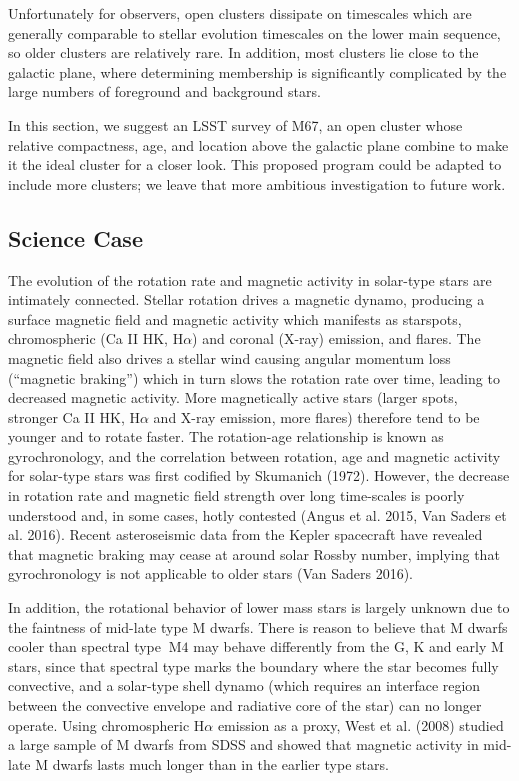 Unfortunately for observers, open clusters dissipate on timescales which are
generally comparable to stellar evolution timescales on the lower main
sequence, so older clusters are relatively rare.
In addition, most clusters lie close to the galactic plane, where determining
membership is significantly complicated by the large numbers of foreground and
background stars.

In this section, we suggest an LSST survey of M67, an open cluster whose
relative compactness, age, and location above the galactic plane combine to
make it the ideal cluster for a closer look. This proposed program could be adapted to include more clusters; we leave that more ambitious investigation to future work.

\subsection{Science Case }

The evolution of the rotation rate and magnetic activity in solar-type
stars are intimately connected. Stellar rotation drives a magnetic
dynamo, producing a surface magnetic field and magnetic activity which
manifests as starspots, chromospheric (Ca II HK, H$\alpha$) and coronal
(X-ray) emission, and flares. The magnetic field also drives a stellar
wind causing angular momentum loss (\textquotedblleft{}magnetic braking'')
which in turn slows the rotation rate over time, leading to decreased
magnetic activity. More magnetically active stars (larger spots, stronger
Ca II HK, H$\alpha$ and X-ray emission, more flares) therefore tend
to be younger and to rotate faster. The rotation-age relationship
is known as gyrochronology, and the correlation between rotation,
age and magnetic activity for solar-type stars was first codified
by Skumanich (1972). However, the decrease in rotation rate and magnetic
field strength over long time-scales is poorly understood and, in
some cases, hotly contested (Angus et al. 2015, Van Saders et al.
2016). Recent asteroseismic data from the Kepler spacecraft have revealed
that magnetic braking may cease at around solar Rossby number, implying
that gyrochronology is not applicable to older stars (Van Saders 2016).

In addition, the rotational behavior of lower mass stars is largely
unknown due to the faintness of mid-late type M dwarfs. There is reason
to believe that M dwarfs cooler than spectral type $~\mathrm{M}4$
may behave differently from the G, K and early M stars, since that
spectral type marks the boundary where the star becomes fully convective,
and a solar-type shell dynamo (which requires an interface region
between the convective envelope and radiative core of the star) can
no longer operate. Using chromospheric H$\alpha$ emission as a proxy,
West et al. (2008) studied a large sample of M dwarfs from SDSS and
showed that magnetic activity in mid-late M dwarfs lasts much longer
than in the earlier type stars.

